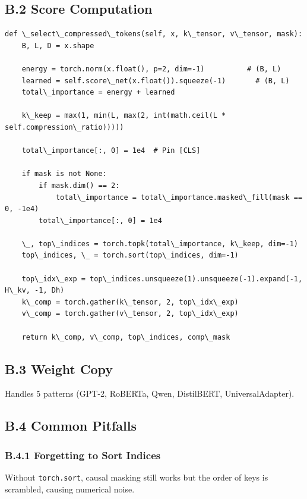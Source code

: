 \subsection{B.2 Score Computation}

\begin{lstlisting}
def \_select\_compressed\_tokens(self, x, k\_tensor, v\_tensor, mask):
    B, L, D = x.shape
    
    energy = torch.norm(x.float(), p=2, dim=-1)          # (B, L)
    learned = self.score\_net(x.float()).squeeze(-1)       # (B, L)
    total\_importance = energy + learned
    
    k\_keep = max(1, min(L, max(2, int(math.ceil(L * self.compression\_ratio)))))
    
    total\_importance[:, 0] = 1e4  # Pin [CLS]
    
    if mask is not None:
        if mask.dim() == 2:
            total\_importance = total\_importance.masked\_fill(mask == 0, -1e4)
        total\_importance[:, 0] = 1e4
    
    \_, top\_indices = torch.topk(total\_importance, k\_keep, dim=-1)
    top\_indices, \_ = torch.sort(top\_indices, dim=-1)
    
    top\_idx\_exp = top\_indices.unsqueeze(1).unsqueeze(-1).expand(-1, H\_kv, -1, Dh)
    k\_comp = torch.gather(k\_tensor, 2, top\_idx\_exp)
    v\_comp = torch.gather(v\_tensor, 2, top\_idx\_exp)
    
    return k\_comp, v\_comp, top\_indices, comp\_mask
\end{lstlisting}

\subsection{B.3 Weight Copy}

Handles 5 patterns (GPT-2, RoBERTa, Qwen, DistilBERT, UniversalAdapter).

\subsection{B.4 Common Pitfalls}

\subsubsection{B.4.1 Forgetting to Sort Indices}

Without \texttt{torch.sort}, causal masking still works but the order of keys is 
scrambled, causing numerical noise.

